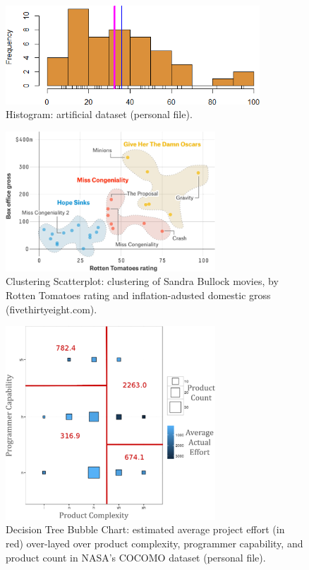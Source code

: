 \afterpage{\FloatBarrier}
\vfill
\begin{figure}[H]
\centering
\includegraphics[width=0.85\textwidth]{images/DV/Histogram_of_GAS.png}
\caption[\small Histogram: artificial dataset ]{\small Histogram: artificial dataset (personal file).} \label{fig:ex_hist_GAS}
\end{figure}
\afterpage{\FloatBarrier}
\vfill 
\newpage
\vfill
\begin{figure}[H]
\centering
\includegraphics[width=0.7\textwidth]{images/DV/clustering.png}
\caption[\small Clustering Scatterplot: clustering of Sandra Bullock movies ]{\small Clustering Scatterplot: clustering of Sandra Bullock movies, by Rotten Tomatoes rating and inflation-adusted domestic gross (fivethirtyeight.com).} \label{fig:ex_cl_bul}
\end{figure}
\afterpage{\FloatBarrier}
\vfill
\begin{figure}[H]
\centering
\includegraphics[width=0.7\textwidth]{images/DV/combined.png}
\caption[\small Decision Tree Bubble Chart: NASA's COCOMO dataset ]{\small Decision Tree Bubble Chart: estimated average project effort (in red) over-layed over product complexity, programmer capability, and product count in NASA's COCOMO dataset (personal file).} \label{fig:ex_sdt_comps}
\end{figure}
